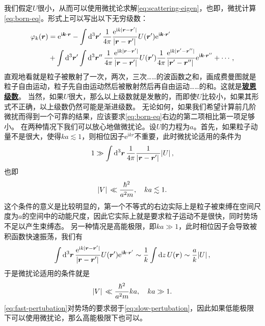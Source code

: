 \documentclass[UTF8, a4paper]{ctexart}
\newcommand*{\ee}{\mathrm{e}}
\newcommand*{\ii}{\mathrm{i}}
\newcommand{\concept}[1]{\underline{\textbf{#1}}}
\begin{document}
我们假定$U$很小，从而可以使用微扰论求解\eqref{eq:scattering-eigen}，也即，微扰计算\eqref{eq:born-eq}。形式上可以写出以下无穷级数：
\[
    \begin{aligned}
        \varphi_k(\vb*{r}) &= \ee^{\ii \vb*{k} \cdot \vb*{r}} - \int \dd[3]{\vb*{r}'} \frac{1}{4\pi} \frac{\ee^{\ii k \abs*{\vb*{r} - \vb*{r}'}}}{\abs*{\vb*{r} - \vb*{r}'}} U(\vb*{r}') \ee^{\ii \vb*{k} \cdot \vb*{r}'} \\
        &+ \int \dd[3]{\vb*{r}'} \int \dd[3]{\vb*{r}''} \frac{1}{4\pi} \frac{\ee^{\ii k \abs*{\vb*{r} - \vb*{r}'}}}{\abs*{\vb*{r} - \vb*{r}'}} U(\vb*{r}') \frac{1}{4\pi} \frac{\ee^{\ii k \abs*{\vb*{r}' - \vb*{r}''}}}{\abs*{\vb*{r}' - \vb*{r}''}} \ee^{\ii \vb*{k} \cdot \vb*{r}''} + \cdots,
    \end{aligned}
\]
直观地看就是粒子被散射了一次，两次，三次……的波函数之和，画成费曼图就是粒子自由运动，粒子先自由运动然后被散射然后再自由运动……的和。这就是\concept{玻恩级数}。
当然，如果$U$很大，那么以上级数就是发散的，而即使$U$比较小，如果其形式不正确，以上级数仍然可能是渐进级数。
无论如何，如果我们希望计算前几阶微扰而得到一个可靠的结果，应该要求\eqref{eq:born-eq}右边的第二项相比第一项足够小。
在两种情况下我们可以放心地做微扰论。设$U$的力程为$a$。首先，如果粒子动量不是很大，使得$k a \lesssim 1$，则相位因子$\ee^{\ii k r}$不重要，此时微扰论适用的条件为
\[
    1 \gg \int \dd[3]{\vb*{r}} \frac{1}{4\pi} \frac{1}{\abs*{\vb*{r} - \vb*{r}'}} \abs*{U},
\]
也即
\begin{equation}
    \abs*{V} \ll \frac{\hbar^2}{a^2 m} , \quad k a \lesssim 1.
    \label{eq:slow-pertubation}
\end{equation}
这个条件的意义是比较明显的，第一个不等式的右边实际上是粒子被束缚在空间尺度为$a$的空间中的动能尺度，因此它实际上就是要求粒子运动不是很快，同时势场不足以产生束缚态。
另一种情况是高能极限，即$ka \gg 1$，此时相位因子会导致被积函数快速振荡，我们有
\[
    \int \dd[3]{\vb*{r}} \frac{\ee^{\ii k \abs*{\vb*{r} - \vb*{r}'}}}{\abs*{\vb*{r} - \vb*{r}'}} U(\vb*{r}') \ee^{\ii \vb*{k} \cdot \vb*{r}'} \sim \frac{1}{k} \int \dd{z} U(\vb*{r}) \sim \frac{a}{k} \abs*{U},
\]
于是微扰论适用的条件就是
\begin{equation}
    \abs*{V} \ll \frac{\hbar^2}{a^2 m } ka , \quad k a \gg 1.
    \label{eq:fast-pertubation}
\end{equation}
\eqref{eq:fast-pertubation}对势场的要求弱于\eqref{eq:slow-pertubation}，因此如果低能极限下可以使用微扰论，那么高能极限下也可以。
\end{document}
